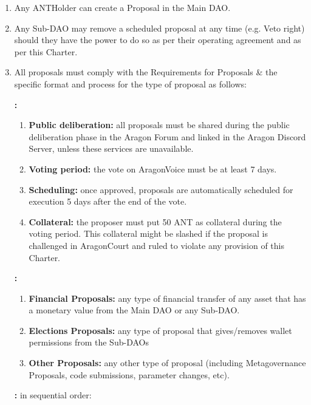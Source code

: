\begin{enumerate}
\begin{enumerate}
	\end{enumerate}

	\begin{enumerate}
		
		\item Any \ac{ANTHolder} can create a Proposal in the Main \ac{DAO}.
		\item Any Sub-\ac{DAO} may remove a scheduled proposal at any time (e.g. Veto right) should they have the power to do so as per their operating agreement and as per this Charter.
		\item All proposals must comply with the Requirements for Proposals \& the specific format and process for the type of proposal as follows:
		
		\textbf{:}
		\begin{enumerate}
			\item \textbf{Public deliberation:} all proposals must be shared during the public deliberation phase in the Aragon Forum and linked in the Aragon Discord Server, unless these services are unavailable.
			\item \textbf{Voting period:} the vote on \gls{AragonVoice} must be at least 7 days.
			\item \textbf{Scheduling:} once approved, proposals are automatically scheduled for execution 5 days after the end of the vote.
			\item \textbf{Collateral:} the proposer must put 50 \ac{ANT} as collateral during the voting period.
			This collateral might be slashed if the proposal is challenged in \gls{AragonCourt} and ruled to violate any provision of this Charter.
		\end{enumerate}
	
		\textbf{:}
		\begin{enumerate}		
			\item \textbf{Financial Proposals:} any type of financial transfer of any asset that has a monetary value from the Main \ac{DAO} or any Sub-\ac{DAO}.
			\item \textbf{Elections Proposals:} any type of proposal that gives/removes wallet permissions from the Sub-\acp{DAO}
			\item \textbf{Other Proposals:} any other type of proposal (including Metagovernance Proposals, code submissions, parameter changes, etc).
		\end{enumerate}

		\textbf{:} in sequential order:
	

\end{enumerate}
\end{enumerate}
